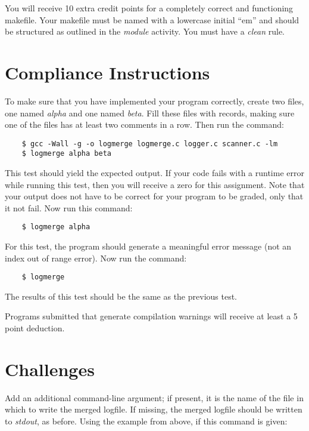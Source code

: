 \documentclass{article}
\begin{document}
You will receive 10 extra credit points for a completely correct and
functioning makefile. Your makefile
must be named with a lowercase initial ``em'' and should be structured as
outlined in the {\it module} activity. You must have a {\it clean} rule.

\section*{Compliance Instructions}

To make sure that you have implemented your
program correctly,  create two files, one named {\it alpha} and one
named {\it beta}. Fill these files with records, making sure one
of the files has at least two comments in a row. Then run the
command:

\begin{verbatim}
    $ gcc -Wall -g -o logmerge logmerge.c logger.c scanner.c -lm
    $ logmerge alpha beta
\end{verbatim}

This test should yield the expected output.
\color{red}
If your code fails with a runtime error while running this test,
then you will
receive a zero for this assignment.
\color{black}
Note that your output does not have to be correct for your program
to be graded, only that it not fail.
Now run this command:

\begin{verbatim}
    $ logmerge alpha
\end{verbatim}

For this test, the program should generate a meaningful error message
(not an index out of range error). Now run the command:

\begin{verbatim}
    $ logmerge
\end{verbatim}

The results of this test should be the same as the previous test.

Programs submitted that generate compilation warnings will receive at
least a 5 point deduction.

\section*{Challenges}

Add an additional command-line
argument; if present, it is the name of the file in which to write
the merged logfile. If missing, the merged logfile should be
written to {\it stdout}, as before.
Using the example from above, if this command is given:
\end{document}
